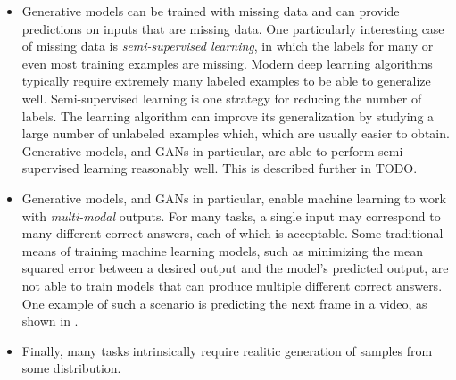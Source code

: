 \begin{itemize}
\item Generative models can be trained with missing data and can provide predictions
  on inputs that are missing data.
  One particularly interesting case of missing data is {\em semi-supervised learning},
  in which the labels for many or even most training examples are missing.
  Modern deep learning algorithms typically require extremely many labeled examples
  to be able to generalize well.
  Semi-supervised learning is one strategy for reducing the number of labels.
  The learning algorithm can improve its generalization by studying a large number
  of unlabeled examples which, which are usually easier to obtain.
  Generative models, and GANs in particular, are able to perform semi-supervised
  learning reasonably well. This is described further in TODO.

\item Generative models, and GANs in particular, enable machine learning to work with
  {\em multi-modal} outputs.
  For many tasks, a single input may correspond to many different correct answers,
  each of which is acceptable.
Some traditional means of training machine learning models, such as minimizing the
mean squared error between a desired output and the model's predicted output, are
not able to train models that can produce multiple different correct answers.
One example of such a scenario is predicting the next frame in a video, as shown
in .

\item Finally, many tasks intrinsically require realitic generation of samples from
  some distribution.
\end{itemize}

